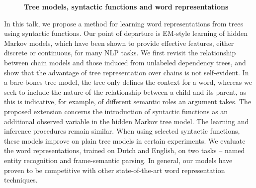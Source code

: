 \documentclass[10pt, a4paper, twopage, headinclude, footinclude, BCOR5mm]{book}
\begin{document}
\newpage

\begin{figure}[t!]
\centering
\large\textbf{Tree models, syntactic functions and word representations}
\vspace*{0.5cm}
\end{figure}


\begin{table}[t!]
\end{table} 
\begin{table}[t!]
\end{table} 
\noindent
In this talk, we propose a method for learning word representations from trees using syntactic functions. Our point of departure is EM-style learning of hidden Markov models, which have been shown to provide effective features, either discrete or continuous, for many NLP tasks. We first revisit the relationship between chain models and those induced from unlabeled dependency trees, and show that the advantage of tree representation over chains is not self-evident.   In a bare-bones tree model, the tree only defines the context for a word, whereas we seek to include the nature of the relationship between a child and its parent, as this is indicative, for example, of different semantic roles an argument takes.  The proposed extension concerns the introduction of syntactic functions as an additional observed variable in the hidden Markov tree model. The learning and inference procedures remain similar. When using selected syntactic functions, these models improve on plain tree models in certain experiments.  We evaluate the word representations, trained on Dutch and English, on two tasks -- named entity recognition and frame-semantic parsing. In general, our models have proven to be competitive with other state-of-the-art word representation techniques.  
\end{document}
